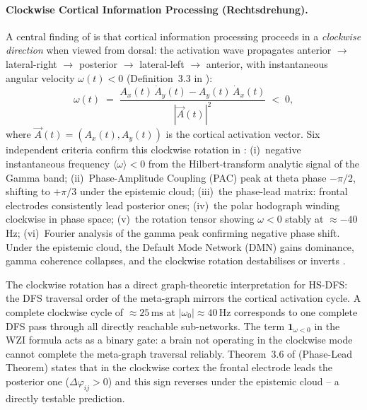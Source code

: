 ﻿\documentclass[12pt,a4paper]{article}
\theoremstyle{plain}
\theoremstyle{definition}
\theoremstyle{remark}
\begin{document}
	\paragraph{Clockwise Cortical Information Processing (Rechtsdrehung).}
	A central finding of \cite{epp2026brain} is that cortical information
	processing proceeds in a \emph{clockwise direction} when viewed from
	dorsal: the activation wave propagates anterior $\to$ lateral-right $\to$
	posterior $\to$ lateral-left $\to$ anterior, with instantaneous angular
	velocity $\omega(t) < 0$ (Definition~3.3 in \cite{epp2026brain}):
	\[
	\omega(t) \;=\;
	\frac{A_x(t)\,\dot{A}_y(t) - A_y(t)\,\dot{A}_x(t)}{|\vec{A}(t)|^2}
	\;<\; 0,
	\]
	where $\vec{A}(t) = (A_x(t), A_y(t))$ is the cortical activation vector.
	Six independent criteria confirm this clockwise rotation in
	\cite{epp2026brain}: (i)~negative instantaneous frequency
	$\langle\omega\rangle < 0$ from the Hilbert-transform analytic signal of
	the Gamma band; (ii)~Phase-Amplitude Coupling (PAC) peak at theta phase
	$-\pi/2$, shifting to $+\pi/3$ under the epistemic cloud; (iii)~the
	phase-lead matrix: frontal electrodes consistently lead posterior ones;
	(iv)~the polar hodograph winding clockwise in phase space; (v)~the
	rotation tensor showing $\omega < 0$ stably at $\approx{-40}$\,Hz;
	(vi)~Fourier analysis of the gamma peak confirming negative phase shift.
	Under the epistemic cloud, the Default Mode Network (DMN) gains
	dominance, gamma coherence collapses, and the clockwise rotation
	destabilises or inverts \cite{epp2026brain}.
	
	The clockwise rotation has a direct graph-theoretic interpretation for
	HS-DFS: the DFS traversal order of the meta-graph mirrors the cortical
	activation cycle.  A complete clockwise cycle of $\approx 25\,\mathrm{ms}$
	at $|\omega_0| \approx 40\,\mathrm{Hz}$ corresponds to one complete DFS
	pass through all directly reachable sub-networks.  The term
	$\mathbf{1}_{\omega < 0}$ in the WZI formula acts as a binary gate:
	a brain not operating in the clockwise mode cannot complete the
	meta-graph traversal reliably.  Theorem~3.6 of \cite{epp2026brain}
	(Phase-Lead Theorem) states that in the clockwise cortex the frontal
	electrode leads the posterior one ($\Delta\varphi_{ij} > 0$) and
	this sign reverses under the epistemic cloud -- a directly testable
	prediction.
	
\end{document}
